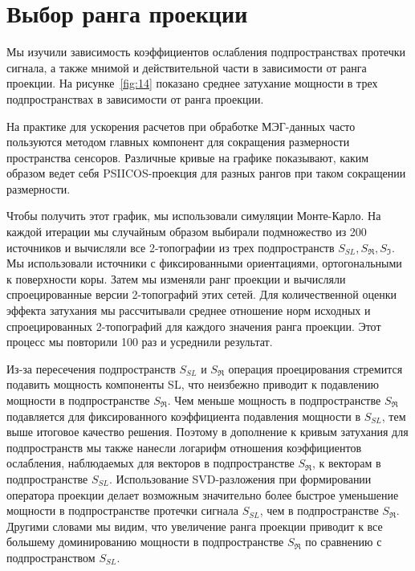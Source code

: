 \section{Выбор ранга проекции}\label{subsec:rank_impact}

Мы изучили зависимость коэффициентов ослабления подпространствах протечки
сигнала, а также мнимой и действительной части в зависимости от ранга проекции.
На рисунке~\ref{fig:14} показано среднее затухание мощности в трех
подпространствах в зависимости от ранга проекции.

На практике для ускорения расчетов при обработке МЭГ-данных часто пользуются
методом главных компонент для сокращения размерности пространства сенсоров.
Различные кривые на графике показывают, каким образом ведет себя PSIICOS-проекция
для разных рангов при таком сокращении размерности.

Чтобы получить этот график, мы использовали симуляции Монте-Карло.
На каждой итерации мы случайным образом выбирали подмножество из 200 источников
и вычисляли все 2-топографии из трех подпространств $S_{SL}, S_{\Re}, S_{\Im}$.
Мы использовали источники с фиксированными ориентациями, ортогональными к поверхности коры.
Затем мы изменяли ранг проекции и вычисляли спроецированные версии 2-топографий этих сетей.
Для количественной оценки эффекта затухания мы рассчитывали среднее отношение
норм исходных и спроецированных 2-топографий для каждого значения ранга проекции.
Этот процесс мы повторили 100 раз и усреднили результат.

Из-за пересечения подпространств $S_{SL}$ и $S_{\Re}$ операция проецирования
стремится подавить мощность компоненты SL, что неизбежно приводит к подавлению
мощности в подпространстве $S_{\Re}$.  Чем меньше мощность в подпространстве
$S_{\Re}$ подавляется для фиксированного коэффициента подавления мощности в
$S_{SL}$, тем выше итоговое качество решения. Поэтому в дополнение к кривым
затухания для подпространств мы также нанесли логарифм отношения коэффициентов
ослабления, наблюдаемых для векторов в подпространстве $S_{\Re}$, к векторам в
подпространстве $S_{SL}$. Использование SVD-разложения при формировании
оператора проекции делает возможным значительно более быстрое уменьшение
мощности в подпространстве протечки сигнала $S_{SL}$, чем в подпространстве $
S_{\Re}$. Другими словами мы видим, что увеличение ранга проекции приводит к
все большему доминированию мощности в подпространстве $S_{\Re}$ по сравнению с
подпространством $S_{SL}$.

